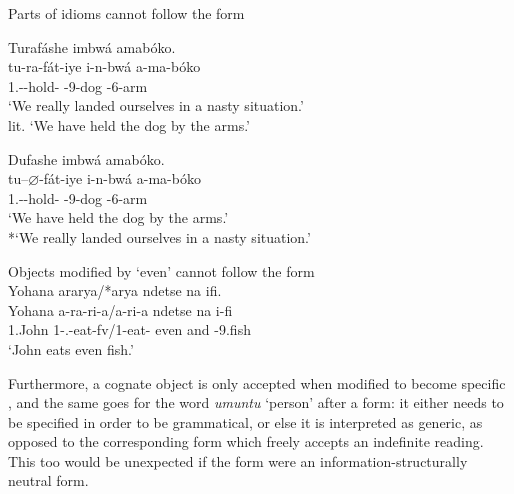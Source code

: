 \documentclass[output=paper]{langscibook}
\begin{document}
\ea
\label{bkm:Ref75772351}
Parts of idioms cannot follow the \CJ{} form\\
\ea
\begin{xlist}
\exi{\DJ}
Turafáshe imbwá amabóko.\\
\gll
tu-ra-fát-iye  i-n-bwá  a-ma-bóko\\
1\PL.\SM-\DJ{}-hold-\PFV{}  \AUG{}-9-dog  \AUG{}-6-arm\\
\glt
‘We really landed ourselves in a nasty situation.’\\
lit. ‘We have held the dog by the arms.’


\end{xlist}

\ex
\begin{xlist}
\exi{\CJ{}}
Dufashe imbwá amabóko.\\
\gll
tu--$\varnothing$-fát-iye  i-n-bwá  a-ma-bóko\\
1\PL.\SM{}-\CJ{}-hold-\PFV{}  \AUG{}-9-dog  \AUG{}-6-arm\\
\glt
‘We have held the dog by the arms.’\\
*`We really landed ourselves in a nasty situation.’


\end{xlist}

\z
\z

\ea
\label{bkm:Ref81548679}
Objects modified by ‘even’ cannot follow the \CJ{} form\\
Yohana ararya/*arya ndetse na ifi.\\
\gll
Yohana  a-ra-ri-a/a-ri-a  ndetse  na  i-fi\\
1.John  1\SM-\PRS.\DJ{}-eat-fv/1\SM{}-eat-\FV{}  even  and  \AUG{}-9.fish\\
\glt
‘John eats even fish.’\\

\z

Furthermore, a cognate object is only accepted when modified to become specific , and the same goes for the word \textit{umuntu} ‘person’ after a \CJ{} form: it either needs to be specified in order to be grammatical, or else it is interpreted as generic, as opposed to the corresponding \DJ{} form which freely accepts an indefinite reading. This too would be unexpected if the \CJ{} form were an information-structurally neutral form.
\end{document}
